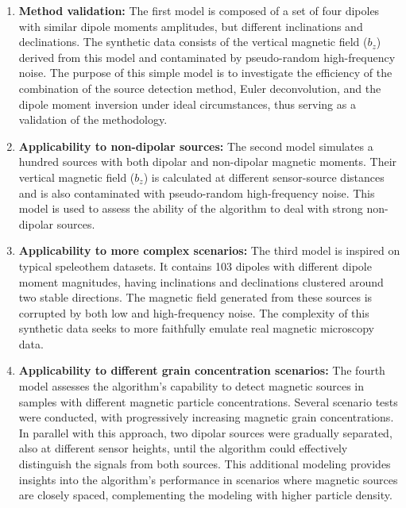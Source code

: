 \begin{enumerate}
\item \textbf{Method validation:}
The first model is composed of a set of four dipoles with similar dipole moments amplitudes, but different inclinations and declinations.
The synthetic data consists of the vertical magnetic field ($b_z$) derived from this model and contaminated by pseudo-random high-frequency noise.
The purpose of this simple model is to investigate the efficiency of the combination of the source detection method, Euler deconvolution, and the dipole moment inversion under ideal circumstances, thus serving as a validation of the methodology.

\item \textbf{Applicability to non-dipolar sources:}
The second model simulates a hundred sources with both dipolar and non-dipolar magnetic moments.
Their vertical magnetic field ($b_z$) is calculated at different sensor-source distances
and is also contaminated with pseudo-random high-frequency noise.
This model is used to assess the ability of the algorithm to deal with strong non-dipolar sources.

\item \textbf{Applicability to more complex scenarios:}
The third model is inspired on typical speleothem datasets.
It contains 103 dipoles with different dipole moment magnitudes, having inclinations and declinations clustered around two stable directions.
The magnetic field generated from these sources is corrupted by both low and high-frequency noise.
The complexity of this synthetic data seeks to more faithfully emulate real magnetic microscopy data.

\item \textbf{Applicability to different grain concentration scenarios:}
The fourth model assesses the algorithm's capability to detect magnetic sources in samples with different magnetic particle concentrations. Several scenario tests were conducted, with progressively increasing magnetic grain concentrations. In parallel with this approach, two dipolar sources were gradually separated, also at different sensor heights, until the algorithm could effectively distinguish the signals from both sources. This additional modeling provides insights into the algorithm's performance in scenarios where magnetic sources are closely spaced, complementing the modeling with higher particle density.

\end{enumerate}

